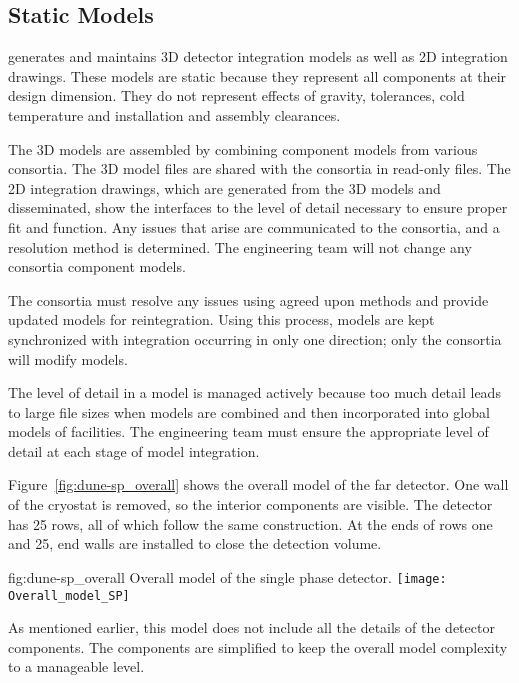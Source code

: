\subsection{Static Models}
\label{sec:fdsp-coord-integ-static}

 generates and maintains 3D detector
integration models as well as 2D integration drawings. These models
are static because they represent all components at their design
dimension. They do not represent effects of gravity, tolerances, cold
temperature and installation and assembly clearances.


The 3D models are assembled by combining component models from various
consortia. The 3D model files are shared with the consortia in
read-only files. The 2D integration drawings, which are generated from
the 3D models and disseminated, show the interfaces to the level of
detail necessary to ensure proper fit and function. Any issues that
arise are communicated to the consortia, and a resolution method is
determined. The  engineering team will not
change any consortia component models.


The consortia must resolve any issues using agreed upon methods and
provide updated models for reintegration. Using this process, models
are kept synchronized with integration occurring in only one
direction; only the consortia will modify models.


The level of detail in a model is managed actively because too much detail leads to large file sizes when models are combined and
then incorporated into global models of facilities. The  engineering team must ensure the
appropriate level of detail at each stage of model
integration.


Figure~\ref{fig:dune-sp_overall} shows the overall model of the  far detector. One wall of the cryostat is removed, so the interior
components are visible. The detector has 25 rows, all of which follow
the same construction. At the ends of rows one and 25, end
walls are installed to close the detection volume.
\begin{dunefigure}{fig:dune-sp_overall}
  {Overall model of the single phase detector.}
  \texttt{[image: Overall\_model\_SP]}
\end{dunefigure}
As mentioned earlier, this model does not include all the details of
the detector components. The components are simplified to keep the
overall model complexity to a manageable level.


